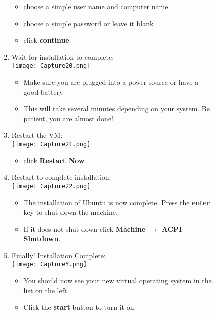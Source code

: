 \documentclass[12pt]{article}
\begin{document}
\begin{description}
\begin{description}
\begin{enumerate}[label=\alph*)]
\begin{itemize}
				 \item choose a simple user name and computer name
				 \item choose a simple password or leave it blank
				 \item click {\bf continue}
                     
            \end{itemize}
\newpage
\item Wait for installation to complete: \vspace{5mm} \\
      		\hspace*{-2.5cm}\texttt{[image: Capture20.png]}
            \begin{itemize}
            \item  Make sure you are plugged into a power source or have a good battery
        \item  This will take several minutes depending on your system. Be patient, you are almost done! \vspace{5mm} \\
    \end{itemize} 

\vspace{5mm} 
\item Restart the VM: \vspace{5mm} \\
	\hspace*{-2.5cm}\texttt{[image: Capture21.png]}  
    \begin{itemize}
        \item click {\bf Restart Now}
    \end{itemize}        

\newpage  

\item Restart to complete installation: \vspace{5mm} \\
      		\texttt{[image: Capture22.png]}
      		 \begin{itemize}
        	\item The installation of Ubuntu is now complete. Press the {\bf enter} key to shut down the machine. 
        	\item If it does not shut down click {\bf Machine $\rightarrow $ ACPI Shutdown}. 
    		\end{itemize}  
  \vspace{5mm}   		
    		\item Finally! Installation Complete: \vspace{5mm} \\
      		\texttt{[image: CaptureY.png]}
      		 \begin{itemize}
        	\item You should now see your new virtual operating system in the list on the left. 
        	\item Click the {\bf start} button to turn it on. 
    		\end{itemize} 
    	

\end{enumerate}
\end{description}
\end{description}
\end{document}
